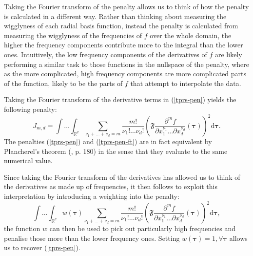 Taking the Fourier transform of the penalty allows us to think of how the penalty is calculated in a different way. Rather than thinking about measuring the wigglyness of each radial basis function, instead the penalty is calculated from measuring the wigglyness of the frequencies of $f$ over the whole domain, the higher the frequency components contribute more to the integral than the lower ones. Intuitively, the low frequency components of the derivatives of $f$ are likely performing a similar task to those functions in the nullspace of the penalty, where as the more complicated, high frequency components are more complicated parts of the function, likely to be the parts of $f$ that attempt to interpolate the data.

Taking the Fourier transform of the derivative terms in (\ref{tprs-pen}) yields the following penalty:
\begin{equation}
J_{m,d} = \int \ldots \int_{\mathbb{R}^d} \sum_{\nu_1 + \dots + \nu_d=m} \frac{m!}{\nu_1! \dots \nu_d!} \left ( \mathfrak{F} \frac{\partial^m f}{\partial x_1^{\nu_1} \ldots  \partial x_d^{\nu_d}} \left (  \boldsymbol{\tau}\right ) \right )^2 \text{d} \boldsymbol{\tau}.
\label{tprs-pen-ft}
\end{equation}
The penalties (\ref{tprs-pen}) and (\ref{tprs-pen-ft}) are in fact equivalent by Plancherel's theorem (\cite{vretblad}, p. 180) in the sense that they evaluate to the same numerical value.

Since taking the Fourier transform of the derivatives has allowed us to think of the derivatives as made up of frequencies, it then follows to exploit this interpretation by introducing a weighting into the penalty: 
\begin{equation}
\int \ldots \int_{\mathbb{R}^d} w(\boldsymbol{\tau}) \sum_{\nu_1 + \dots + \nu_d=m} \frac{m!}{\nu_1! \dots \nu_d!} \left ( \mathfrak{F} \frac{\partial^m f}{\partial x_1^{\nu_1} \ldots  \partial x_d^{\nu_d}} \left (\boldsymbol{\tau} \right ) \right )^2 \text{d} \boldsymbol{\tau},
\label{duchon-penalty-general}
\end{equation}
the function $w$ can then be used to pick out particularly high frequencies and penalise those more than the lower frequency ones. Setting $w(\boldsymbol{\tau})=1, \forall \boldsymbol{\tau}$ allows us to recover (\ref{tprs-pen}).

